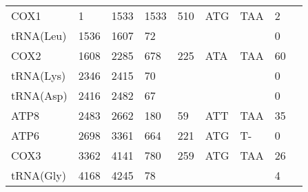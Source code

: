 \documentclass[../DISSERTACAO_MAIN.tex]{subfiles}
\begin{document}
\begin{longtable}{llllllllllllllllllllll}
			COX1         & \multicolumn{2}{l}{1}       & \multicolumn{2}{l}{1533}    & \multicolumn{2}{l}{1533}        & \multicolumn{3}{l}{510}                       & \multicolumn{3}{l}{ATG}   & \multicolumn{3}{l}{TAA}     & \multicolumn{3}{l}{2}           & \multicolumn{3}{l}{}         \\
			tRNA(Leu)    & \multicolumn{2}{l}{1536}    & \multicolumn{2}{l}{1607}    & \multicolumn{2}{l}{72}          & \multicolumn{3}{l}{}                          & \multicolumn{3}{l}{}      & \multicolumn{3}{l}{}        & \multicolumn{3}{l}{0}           & \multicolumn{3}{l}{}         \\
			COX2         & \multicolumn{2}{l}{1608}    & \multicolumn{2}{l}{2285}    & \multicolumn{2}{l}{678}         & \multicolumn{3}{l}{225}                       & \multicolumn{3}{l}{ATA}   & \multicolumn{3}{l}{TAA}     & \multicolumn{3}{l}{60}          & \multicolumn{3}{l}{}         \\
			tRNA(Lys)    & \multicolumn{2}{l}{2346}    & \multicolumn{2}{l}{2415}    & \multicolumn{2}{l}{70}          & \multicolumn{3}{l}{}                          & \multicolumn{3}{l}{}      & \multicolumn{3}{l}{}        & \multicolumn{3}{l}{0}           & \multicolumn{3}{l}{}         \\
			tRNA(Asp)    & \multicolumn{2}{l}{2416}    & \multicolumn{2}{l}{2482}    & \multicolumn{2}{l}{67}          & \multicolumn{3}{l}{}                          & \multicolumn{3}{l}{}      & \multicolumn{3}{l}{}        & \multicolumn{3}{l}{0}           & \multicolumn{3}{l}{}         \\
			ATP8         & \multicolumn{2}{l}{2483}    & \multicolumn{2}{l}{2662}    & \multicolumn{2}{l}{180}         & \multicolumn{3}{l}{59}                        & \multicolumn{3}{l}{ATT}   & \multicolumn{3}{l}{TAA}     & \multicolumn{3}{l}{35}          & \multicolumn{3}{l}{}         \\
			ATP6         & \multicolumn{2}{l}{2698}    & \multicolumn{2}{l}{3361}    & \multicolumn{2}{l}{664}         & \multicolumn{3}{l}{221}                       & \multicolumn{3}{l}{ATG}   & \multicolumn{3}{l}{T-}      & \multicolumn{3}{l}{0}           & \multicolumn{3}{l}{}         \\
			COX3         & \multicolumn{2}{l}{3362}    & \multicolumn{2}{l}{4141}    & \multicolumn{2}{l}{780}         & \multicolumn{3}{l}{259}                       & \multicolumn{3}{l}{ATG}   & \multicolumn{3}{l}{TAA}     & \multicolumn{3}{l}{26}          & \multicolumn{3}{l}{}         \\
			tRNA(Gly)    & \multicolumn{2}{l}{4168}    & \multicolumn{2}{l}{4245}    & \multicolumn{2}{l}{78}          & \multicolumn{3}{l}{}                          & \multicolumn{3}{l}{}      & \multicolumn{3}{l}{}        & \multicolumn{3}{l}{4}           & \multicolumn{3}{l}{}         \\

\end{longtable}
\end{document}

